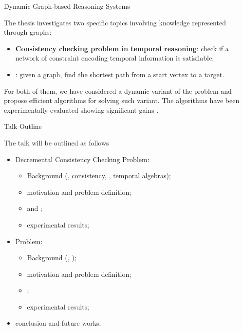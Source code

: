 \begin{frame}{Dynamic Graph-based Reasoning Systems}

    The thesis investigates two specific topics involving knowledge represented through graphs:

    \begin{itemize}
        \item \textbf{Consistency checking problem in temporal reasoning}: check if a network of constraint encoding temporal information is satisfiable;
        \item \textbf{\pathfinding{}}: given a graph, find the shortest path from a start vertex to a target.
    \end{itemize}

    For both of them, we have considered a dynamic variant of the problem and propose efficient algorithms for solving such variant. 
    The algorithms have been experimentally evaluated showing significant gains \wrt{} \stateofart{}.
\end{frame}

\begin{frame}{Talk Outline}

    The talk will be outlined as follows
    \begin{itemize}
        \item Decremental Consistency Checking Problem:
        \begin{itemize}
            \item Background (\CSPName{}, consistency, \tlGraphName{}, temporal algebras);
            \item motivation and problem definition;
            \item \DPASATAlgorithmName{} and \DOHSATAlgorithmName{};
            \item experimental results;
        \end{itemize}
        \item \SAPFEC{} Problem:
        \begin{itemize}
            \item Background (\pathfinding{}, \CPD{});
            \item motivation and problem definition;
            \item \CPDSearch{};
            \item experimental results;
        \end{itemize}
        \item conclusion and future works;
    \end{itemize}
\end{frame}